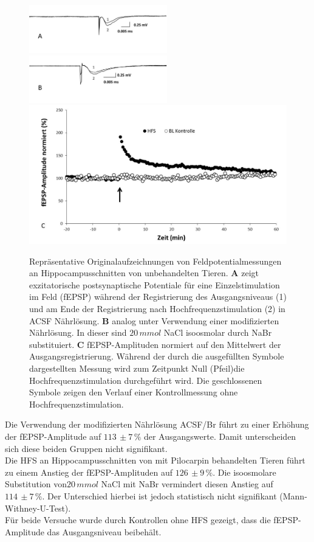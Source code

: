 \documentclass[a4paper,11pt]{report}
\begin{document}
{\begin{figure}[H]
\begin{center}
\includegraphics[width=6cm]{Abbildungen/feld_samples/field_k_c.jpg}
\includegraphics[width=6cm]{Abbildungen/feld_samples/field_k_br.jpg}
\includegraphics[width=13cm]{Abbildungen/feld_samples/ltp_k_chfs_mean}
\caption{Repräsentative Originalaufzeichnungen von Feldpotentialmessungen an Hippocampusschnitten von unbehandelten Tieren. \textbf{A} zeigt exzitatorische postsynaptische Potentiale  für eine Einzelstimulation im Feld (fEPSP) während der Registrierung des Ausgangsniveaus (1) und am Ende der Registrierung nach Hochfrequenzstimulation (2) in ACSF Nährlösung. \textbf{B} analog unter Verwendung einer modifizierten Nährlösung. In dieser sind $20\, mmol$ NaCl isoosmolar durch NaBr substituiert. \textbf{C} fEPSP-Amplituden normiert auf den Mittelwert der Ausgangsregistrierung. Während der durch die ausgefüllten Symbole dargestellten Messung wird zum Zeitpunkt Null (Pfeil)die Hochfrequenzstimulation durchgeführt wird. Die geschlossenen Symbole zeigen den Verlauf einer Kontrollmessung ohne Hochfrequenzstimulation.}
\end{center}
\end{figure}


Die Verwendung der modifizierten Nährlösung ACSF/Br führt zu einer Erhöhung der fEPSP-Amplitude auf $113\,\pm 7\,\%$ der Ausgangswerte. Damit  unterscheiden sich diese beiden Gruppen nicht signifikant.\\
Die HFS an Hippocampusschnitten von mit Pilocarpin behandelten Tieren führt zu einem Anstieg der fEPSP-Amplituden auf $126\,\pm 9\,\%$. Die isoosmolare Substitution  von$20\, mmol$ NaCl mit NaBr vermindert diesen Anstieg auf $114\,\pm 7\,\%$. Der Unterschied hierbei ist jedoch statistisch nicht signifikant (Mann-Withney-U-Test).\\
Für beide Versuche wurde durch Kontrollen ohne HFS gezeigt, dass die fEPSP-Amplitude das Ausgangsniveau beibehält.\

}
\end{document}
